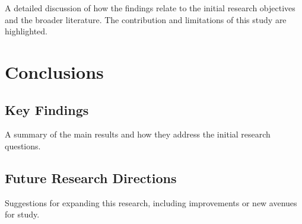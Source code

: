 \documentclass[a4paper,12pt]{report}
\begin{document}
A detailed discussion of how the findings relate to the initial research objectives and the broader literature. The contribution and limitations of this study are highlighted.

\chapter{Conclusions}

\section{Key Findings}
A summary of the main results and how they address the initial research questions.

\section{Future Research Directions}
Suggestions for expanding this research, including improvements or new avenues for study.
\end{document}
